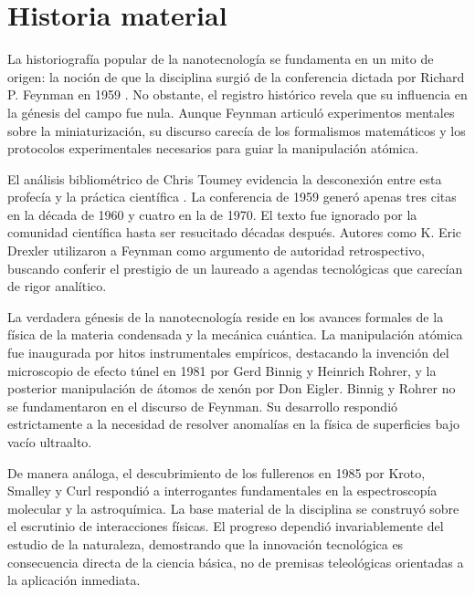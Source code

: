 \section{Historia material}

La historiografía popular de la nanotecnología se fundamenta en un mito de
origen: la noción de que la disciplina surgió de la conferencia dictada por
Richard P. Feynman en 1959 \cite{feynmanTheresPlentyRoom2011}.
No obstante, el registro histórico revela que su influencia en la génesis del
campo fue nula. Aunque Feynman articuló experimentos mentales sobre la
miniaturización, su discurso carecía de los formalismos matemáticos y los
protocolos experimentales necesarios para guiar la manipulación atómica.

El análisis bibliométrico de Chris Toumey evidencia la desconexión entre
esta profecía y la práctica científica \cite{toumeyReadingFeynmanNanotechnology2008}.
La conferencia de 1959 generó apenas tres citas en la década de 1960 y cuatro en
la de 1970. El texto fue ignorado por la comunidad científica hasta ser
resucitado décadas después. Autores como K. Eric Drexler utilizaron a Feynman
como argumento de autoridad retrospectivo, buscando conferir el prestigio de un
laureado a agendas tecnológicas que carecían de rigor analítico.

La verdadera génesis de la nanotecnología reside en los avances formales de
la física de la materia condensada y la mecánica cuántica. La
manipulación atómica fue inaugurada por hitos instrumentales empíricos,
destacando la invención del microscopio de efecto túnel en 1981 por Gerd
Binnig y Heinrich Rohrer, y la posterior manipulación de átomos de
xenón por Don Eigler. Binnig y Rohrer no se fundamentaron en el discurso de
Feynman. Su desarrollo respondió estrictamente a la necesidad de resolver
anomalías en la física de superficies bajo vacío ultraalto.

De manera análoga, el descubrimiento de los fullerenos en 1985 por Kroto,
Smalley y Curl respondió a interrogantes fundamentales en la espectroscopía
molecular y la astroquímica. La base material de la disciplina se
construyó sobre el escrutinio de interacciones físicas. El progreso dependió
invariablemente del estudio de la naturaleza, demostrando que la innovación
tecnológica es consecuencia directa de la ciencia básica, no de premisas
teleológicas orientadas a la aplicación inmediata.

